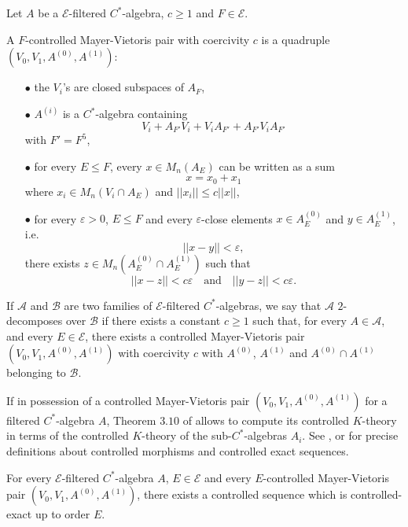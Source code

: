\begin{frame}
Let $A$ be a $\mathcal E$-filtered $C^*$-algebra, $c\geq 1$ and $F\in \mathcal E$.
\begin{definition}
 A $F$-controlled Mayer-Vietoris pair with coercivity $c$ is a quadruple $(V_0, V_1, A^{(0)}, A^{(1)})$:
\begin{itemize}
\item[$\bullet$] the $V_i$'s are closed subspaces of $A_F$,
\item[$\bullet$] $A^{(i)}$ is a $C^*$-algebra containing \[ V_i + A_{F'} V_i + V_i A_{F'}  + A_{F'} V_i A_{F'}\]
with $F' = F^5$,
\item[$\bullet$] for every $E\leq F$, every $x\in M_n(A_E)$ can be written as a sum \[x=x_0+x_1\] where $x_i\in M_n(V_i \cap A_E)$ and $|| x_i|| \leq c||x||$,
\item[$\bullet$] for every $\varepsilon>0$, $E\leq F$ and every $\varepsilon$-close elements $x\in A_E^{(0)}$ and $y\in A_E^{(1)}$, i.e.
\[|| x-y || < \varepsilon,\]
there exists $z\in M_n( A_E^{(0)}\cap A_E^{(1)})$ such that \[ ||x-z|| < c\varepsilon \quad \text{and} \quad ||y-z|| < c\varepsilon .\]
\end{itemize}
If $\mathcal A$ and $\mathcal B$ are two families of $\mathcal E$-filtered $C^*$-algebras, we say that $\mathcal A$ $2$-decomposes over $\mathcal B$ if there exists a constant $c\geq 1$ such that, for every $A\in\mathcal A$, and every $E\in \mathcal E$, there exists a controlled Mayer-Vietoris pair $(V_0, V_1, A^{(0)}, A^{(1)})$ with coercivity $c$ with $A^{(0)}$, $A^{(1)}$ and $A^{(0)} \cap A^{(1)}$ belonging to $\mathcal B$.
\end{definition} 
\end{frame}

\begin{frame}
If in possession of a controlled Mayer-Vietoris pair $(V_0, V_1, A^{(0)}, A^{(1)})$ for a filtered $C^*$-algebra $A$, Theorem $3.10$ of \cite{OY4} allows to compute its controlled $K$-theory in terms of the controlled $K$-theory of the sub-$C^*$-algebras $A_i$. See \cite{OY4},\cite{DellAieraThesis} or \cite{dell2017controlled} for precise definitions about controlled morphisms and controlled exact sequences. 

\begin{thmfr}
For every $\mathcal E$-filtered $C^*$-algebra $A$, $E\in \mathcal E$ and every $E$-controlled Mayer-Vietoris pair $(V_0, V_1, A^{(0)}, A^{(1)})$, there exists a controlled sequence
which is controlled-exact up to order $E$.  
\end{thmfr}  
\end{frame}

